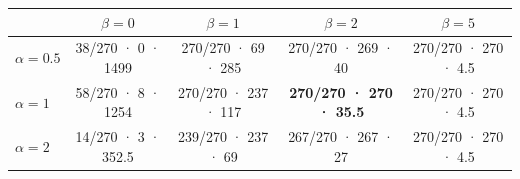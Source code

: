 \begin{tabular}{lcccc}\toprule
 & $\beta=0$ & $\beta=1$ & $\beta=2$ & $\beta=5$\\\midrule
$\alpha=0.5$ & 38/270 · 0 · 1499 & 270/270 · 69 · 285 & 270/270 · 269 · 40 & 270/270 · 270 · 4.5\\
$\alpha=1$ & 58/270 · 8 · 1254 & 270/270 · 237 · 117 & \textbf{270/270 · 270 · 35.5} & 270/270 · 270 · 4.5\\
$\alpha=2$ & 14/270 · 3 · 352.5 & 239/270 · 237 · 69 & 267/270 · 267 · 27 & 270/270 · 270 · 4.5\\
\bottomrule\end{tabular}
